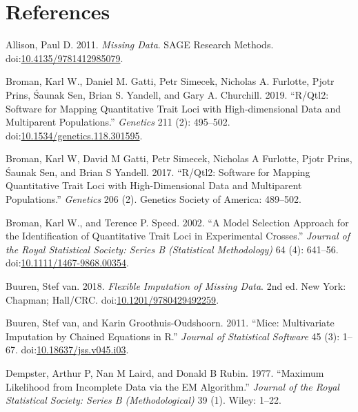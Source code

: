 \documentclass[
  12pt,
]{article}
\newlength{\cslhangindent}
\newlength{\cslentryspacingunit} %
\newenvironment{CSLReferences}[2] %
 {%
  \setlength{\parindent}{0pt}
  \ifodd #1
  \let\oldpar\par
  \def\par{\hangindent=\cslhangindent\oldpar}
  \fi
  \setlength{\parskip}{#2\cslentryspacingunit}
 }%
 {}
\begin{document}
\clearpage

\hypertarget{references}{%
\section{References}\label{references}}

\hypertarget{refs}{}
\begin{CSLReferences}{1}{0}
\leavevmode{}%
Allison, Paul D. 2011. \emph{Missing Data}. SAGE Research Methods.
doi:\href{https://doi.org/10.4135/9781412985079}{10.4135/9781412985079}.

\leavevmode{}%
Broman, Karl W., Daniel M. Gatti, Petr Simecek, Nicholas A. Furlotte,
Pjotr Prins, Śaunak Sen, Brian S. Yandell, and Gary A. Churchill. 2019.
{``R/Qtl2: Software for Mapping Quantitative Trait Loci with
High‑dimensional Data and Multiparent Populations.''} \emph{Genetics}
211 (2): 495--502.
doi:\href{https://doi.org/10.1534/genetics.118.301595}{10.1534/genetics.118.301595}.

\leavevmode{}%
Broman, Karl W, David M Gatti, Petr Simecek, Nicholas A Furlotte, Pjotr
Prins, Śaunak Sen, and Brian S Yandell. 2017. {``R/Qtl2: Software for
Mapping Quantitative Trait Loci with High-Dimensional Data and
Multiparent Populations.''} \emph{Genetics} 206 (2). Genetics Society of
America: 489--502.

\leavevmode{}%
Broman, Karl W., and Terence P. Speed. 2002. {``A Model Selection
Approach for the Identification of Quantitative Trait Loci in
Experimental Crosses.''} \emph{Journal of the Royal Statistical Society:
Series B (Statistical Methodology)} 64 (4): 641--56.
doi:\href{https://doi.org/10.1111/1467-9868.00354}{10.1111/1467-9868.00354}.

\leavevmode{}%
Buuren, Stef van. 2018. \emph{Flexible Imputation of Missing Data}. 2nd
ed. New York: Chapman; Hall/CRC.
doi:\href{https://doi.org/10.1201/9780429492259}{10.1201/9780429492259}.

\leavevmode{}%
Buuren, Stef van, and Karin Groothuis-Oudshoorn. 2011. {``Mice:
Multivariate Imputation by Chained Equations in {R}.''} \emph{Journal of
Statistical Software} 45 (3): 1--67.
doi:\href{https://doi.org/10.18637/jss.v045.i03}{10.18637/jss.v045.i03}.

\leavevmode{}%
Dempster, Arthur P, Nan M Laird, and Donald B Rubin. 1977. {``Maximum
Likelihood from Incomplete Data via the EM Algorithm.''} \emph{Journal
of the Royal Statistical Society: Series B (Methodological)} 39 (1).
Wiley: 1--22.


\end{CSLReferences}
\end{document}
